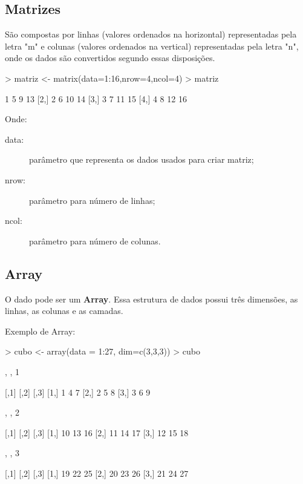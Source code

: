 \documentclass[12pt,a4paper,oneside]{erdc}
\begin{document}
\subsection{Matrizes}
São compostas por linhas (valores ordenados na horizontal) representadas pela letra "m" e colunas (valores ordenados na vertical) representadas pela letra "n", onde os dados são convertidos segundo essas disposições.
\begin{Schunk}
\begin{Sinput}
> matriz <- matrix(data=1:16,nrow=4,ncol=4)
> matriz
\end{Sinput}
\begin{Soutput}
     [,1] [,2] [,3] [,4]
[1,]    1    5    9   13
[2,]    2    6   10   14
[3,]    3    7   11   15
[4,]    4    8   12   16
\end{Soutput}
\end{Schunk}
Onde:
       \begin{description}
       \item [data:] parâmetro que representa os dados usados para criar matriz;
       \item [nrow:] parâmetro para número de linhas;
       \item [ncol:] parâmetro para número de colunas.
       \end{description}

\subsection{Array}

O dado pode ser um \textbf{Array}. Essa estrutura de dados possui três dimensões, as linhas, as colunas e as camadas. 

Exemplo de Array:
\begin{Schunk}
\begin{Sinput}
> cubo <- array(data = 1:27, dim=c(3,3,3))
> cubo
\end{Sinput}
\begin{Soutput}
, , 1

     [,1] [,2] [,3]
[1,]    1    4    7
[2,]    2    5    8
[3,]    3    6    9

, , 2

     [,1] [,2] [,3]
[1,]   10   13   16
[2,]   11   14   17
[3,]   12   15   18

, , 3

     [,1] [,2] [,3]
[1,]   19   22   25
[2,]   20   23   26
[3,]   21   24   27
\end{Soutput}
\end{Schunk}
\end{document}
